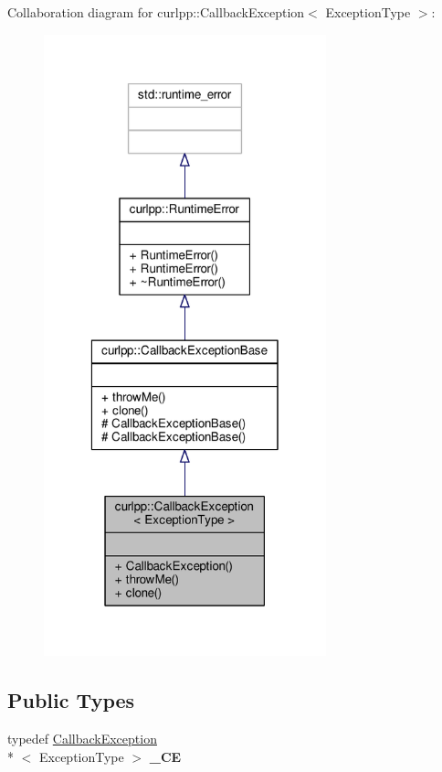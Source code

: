 Collaboration diagram for curlpp\-:\-:Callback\-Exception$<$ Exception\-Type $>$\-:
\nopagebreak
\begin{figure}[H]
\begin{center}
\leavevmode
\includegraphics[width=232pt]{classcurlpp_1_1CallbackException__coll__graph}
\end{center}
\end{figure}
\subsection*{Public Types}
\begin{DoxyCompactItemize}
\item 
\hypertarget{classcurlpp_1_1CallbackException_a14c78c379d35648c686fbcebee24b678}{typedef \hyperlink{classcurlpp_1_1CallbackException}{Callback\-Exception}\\*
$<$ Exception\-Type $>$ {\bfseries \-\_\-\-C\-E}}\label{classcurlpp_1_1CallbackException_a14c78c379d35648c686fbcebee24b678}

\end{DoxyCompactItemize}
